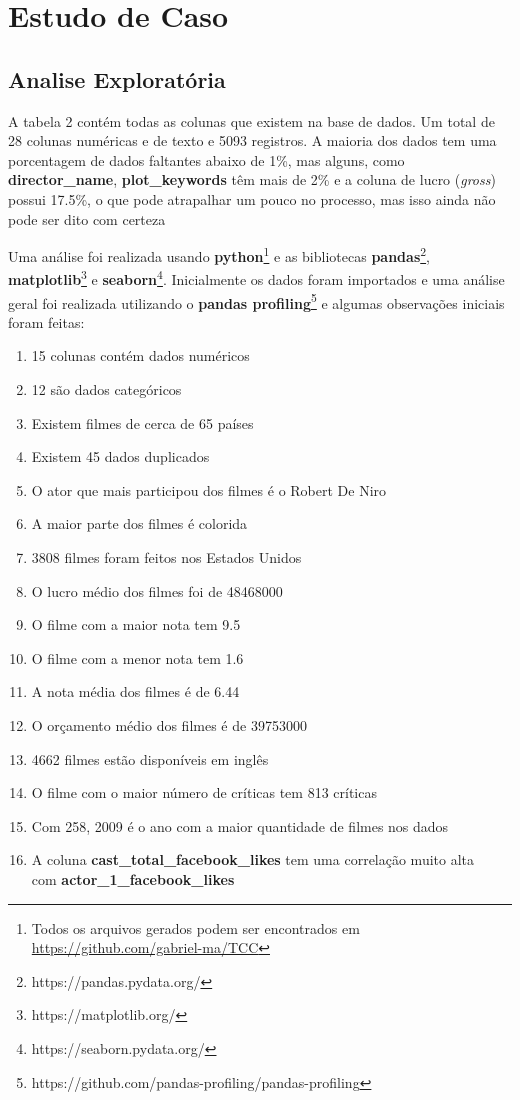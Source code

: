 \section{Estudo de Caso}
\subsection{Analise Exploratória}
A tabela 2 contém todas as colunas que existem na base de dados. Um total de 28 colunas numéricas e de texto e 5093 registros. A maioria dos dados tem uma porcentagem de dados faltantes abaixo de 1\%, mas alguns, como \textbf{director\_name}, \textbf{plot\_keywords} têm mais de 2\% e a coluna de lucro (\textit{gross}) possui 17.5\%, o que pode atrapalhar um pouco no processo, mas isso ainda não pode ser dito com certeza


Uma análise foi realizada usando \textbf{python}\footnote{Todos os arquivos gerados podem ser encontrados em \url{https://github.com/gabriel-ma/TCC}} e as bibliotecas \textbf{pandas}\footnote{https://pandas.pydata.org/}, \textbf{matplotlib}\footnote{https://matplotlib.org/} e \textbf{seaborn}\footnote{https://seaborn.pydata.org/}. Inicialmente os dados foram importados e uma análise geral foi realizada utilizando o \textbf{pandas profiling}\footnote{https://github.com/pandas-profiling/pandas-profiling} e algumas observações iniciais foram feitas:
\begin{enumerate}
    \item 15 colunas contém dados numéricos
    \item 12 são dados categóricos
    \item Existem filmes de cerca de 65 países
    \item Existem 45 dados duplicados
    \item O ator que mais participou dos filmes é o Robert De Niro 
    \item A maior parte dos filmes é colorida
    \item 3808  filmes foram feitos nos Estados Unidos
    \item O lucro médio dos filmes foi de 48468000
    \item O filme com a maior nota tem 9.5
    \item O filme com a menor nota tem 1.6
    \item A nota média dos filmes é de 6.44
    \item O orçamento médio dos filmes é de 39753000
    \item 4662 filmes estão disponíveis em inglês
    \item O filme com o maior número de críticas tem 813 críticas
    \item Com 258, 2009 é o ano com a maior quantidade de filmes nos dados
    \item A coluna \textbf{cast\_total\_facebook\_likes} tem uma correlação muito alta\\ com \textbf{actor\_1\_facebook\_likes}
\end{enumerate}

